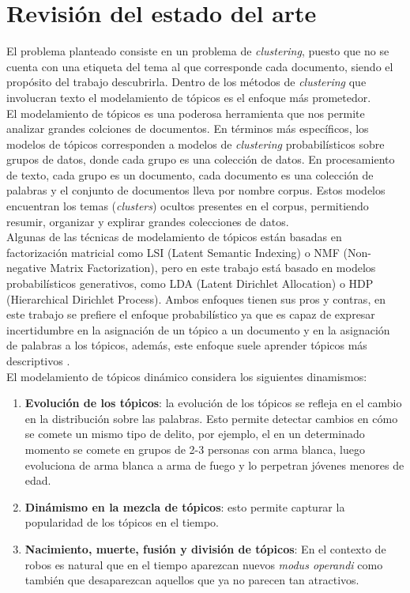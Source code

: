 \documentclass[letterpaper,12pt,oneside]{book} %
\begin{document}
\section{Revisión del estado del arte}

El problema planteado consiste en un problema de \textit{clustering}, puesto que no se cuenta con una etiqueta del tema al que corresponde cada documento, siendo el propósito del trabajo descubrirla. Dentro de los métodos de \textit{clustering} que involucran texto el modelamiento de tópicos es el enfoque más prometedor.\\

El modelamiento de tópicos es una poderosa herramienta que nos permite analizar grandes colciones de documentos. En términos más específicos, los modelos de tópicos corresponden a modelos de \textit{clustering} probabilísticos sobre grupos de datos, donde cada grupo es una colección de datos. En procesamiento de texto, cada grupo es un documento, cada documento es una colección de palabras y el conjunto de documentos lleva por nombre corpus. Estos modelos encuentran los temas (\textit{clusters}) ocultos presentes en el corpus, permitiendo resumir, organizar y explirar grandes colecciones de datos.\\

Algunas de las técnicas de modelamiento de tópicos están basadas en factorización matricial como LSI (Latent Semantic Indexing) \citep{dumais2004latent} o NMF (Non-negative Matrix Factorization)\citep{xu2003document}, pero en este trabajo está basado en modelos probabilísticos generativos, como LDA (Latent Dirichlet Allocation)\citep{blei2003latent} o HDP (Hierarchical Dirichlet Process)\citep{teh2005sharing}. Ambos enfoques tienen sus pros y contras, en este trabajo se prefiere el enfoque probabilístico ya que es capaz de expresar incertidumbre en la asignación de un tópico a un documento y en la asignación de palabras a los tópicos, además, este enfoque suele aprender tópicos más descriptivos \citep{stevens2012exploring}.\\

El modelamiento de tópicos dinámico considera los siguientes dinamismos:
\begin{enumerate}
    \item \textbf{Evolución de los tópicos}: la evolución de los tópicos se refleja en el cambio en la distribución sobre las palabras. Esto permite detectar cambios en cómo se comete un mismo tipo de delito, por ejemplo, el  en un determinado momento se comete en grupos de 2-3 personas con arma blanca, luego evoluciona de arma blanca a arma de fuego y lo perpetran jóvenes menores de edad.
    \item \textbf{Dinámismo en la mezcla de tópicos}: esto permite capturar la popularidad de los tópicos en el tiempo.
    \item \textbf{Nacimiento, muerte, fusión y división de tópicos}: En el contexto de robos es natural que en el tiempo aparezcan nuevos \textit{modus operandi} como también que desaparezcan aquellos que ya no parecen tan atractivos.
\end{enumerate}
\end{document}
